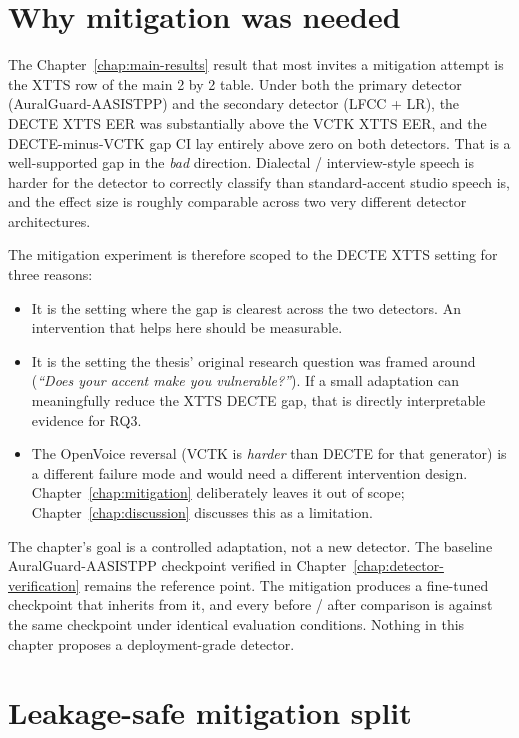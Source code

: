\section{Why mitigation was needed}
\label{sec:mitigation-motivation}

The Chapter~\ref{chap:main-results} result that most invites a mitigation attempt is the
XTTS row of the main 2 by 2 table. Under both the primary detector
(AuralGuard-AASISTPP) and the secondary detector (LFCC + LR), the
DECTE XTTS EER was substantially above the VCTK XTTS EER, and the
DECTE-minus-VCTK gap CI lay entirely above zero on both detectors.
That is a well-supported gap in the \emph{bad} direction. Dialectal
/ interview-style speech is harder for the detector to correctly
classify than standard-accent studio speech is, and the effect
size is roughly comparable across two very different detector
architectures.

The mitigation experiment is therefore scoped to the DECTE XTTS
setting for three reasons:

\begin{itemize}
    \item It is the setting where the gap is clearest across the two
        detectors. An intervention that helps here should be measurable.
    \item It is the setting the thesis' original research question was
        framed around (\emph{``Does your accent make you vulnerable?''}). If a
        small adaptation can meaningfully reduce the XTTS DECTE gap,
        that is directly interpretable evidence for RQ3.
    \item The OpenVoice reversal (VCTK is \emph{harder} than DECTE for that
        generator) is a different failure mode and would need a
        different intervention design. Chapter~\ref{chap:mitigation} deliberately leaves
        it out of scope; Chapter~\ref{chap:discussion} discusses this as a limitation.
\end{itemize}

The chapter's goal is a controlled adaptation, not a new
detector. The baseline AuralGuard-AASISTPP checkpoint verified
in Chapter~\ref{chap:detector-verification} remains the reference point. The mitigation
produces a fine-tuned checkpoint that inherits from it, and every
before / after comparison is against the same checkpoint under
identical evaluation conditions. Nothing in this chapter proposes
a deployment-grade detector.


\section{Leakage-safe mitigation split}
\label{sec:mitigation-split}

